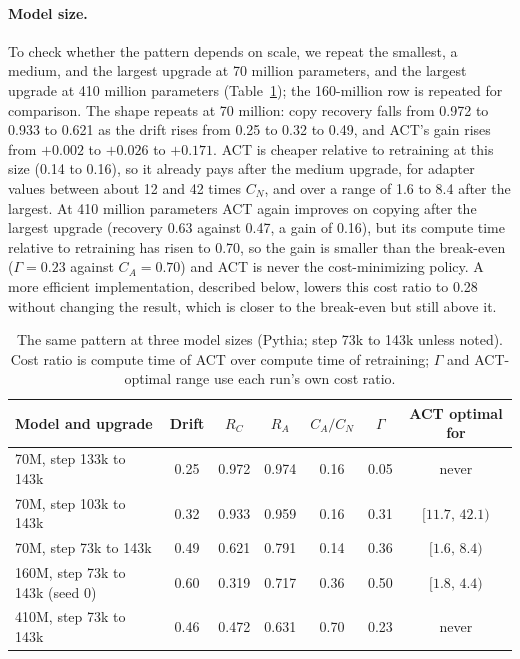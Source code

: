 \documentclass[preprint,12pt,authoryear]{elsarticle}
\begin{document}
\paragraph{Model size.} To check whether the pattern depends on scale, we repeat the smallest, a medium, and the largest upgrade at 70 million parameters, and the largest upgrade at 410 million parameters (Table~\ref{tab:scale}); the 160-million row is repeated for comparison.
The shape repeats at 70 million: copy recovery falls from 0.972 to 0.933 to 0.621 as the drift rises from 0.25 to 0.32 to 0.49, and ACT's gain rises from $+0.002$ to $+0.026$ to $+0.171$. ACT is cheaper relative to retraining at this size (0.14 to 0.16), so it already pays after the medium upgrade, for adapter values between about 12 and 42 times $C_N$, and over a range of 1.6 to 8.4 after the largest.
At 410 million parameters ACT again improves on copying after the largest upgrade (recovery 0.63 against 0.47, a gain of 0.16), but its compute time relative to retraining has risen to 0.70, so the gain is smaller than the break-even ($\Gamma=0.23$ against $C_A=0.70$) and ACT is never the cost-minimizing policy. A more efficient implementation, described below, lowers this cost ratio to 0.28 without changing the result, which is closer to the break-even but still above it.

\begin{table}[t]
\centering
\caption{The same pattern at three model sizes (Pythia; step 73k to 143k unless noted). Cost ratio is compute time of ACT over compute time of retraining; $\Gamma$ and ACT-optimal range use each run's own cost ratio.}\label{tab:scale}
\begin{tabular}{lcccccc}
\toprule
Model and upgrade & Drift & $R_C$ & $R_A$ & $C_A/C_N$ & $\Gamma$ & ACT optimal for\\
\midrule
70M, step 133k to 143k & 0.25 & 0.972 & 0.974 & 0.16 & 0.05 & never\\
70M, step 103k to 143k & 0.32 & 0.933 & 0.959 & 0.16 & 0.31 & $[11.7,\,42.1)$\\
70M, step 73k to 143k & 0.49 & 0.621 & 0.791 & 0.14 & 0.36 & $[1.6,\,8.4)$\\
160M, step 73k to 143k (seed 0) & 0.60 & 0.319 & 0.717 & 0.36 & 0.50 & $[1.8,\,4.4)$\\
410M, step 73k to 143k & 0.46 & 0.472 & 0.631 & 0.70 & 0.23 & never\\
\bottomrule
\end{tabular}
\end{table}
\end{document}

